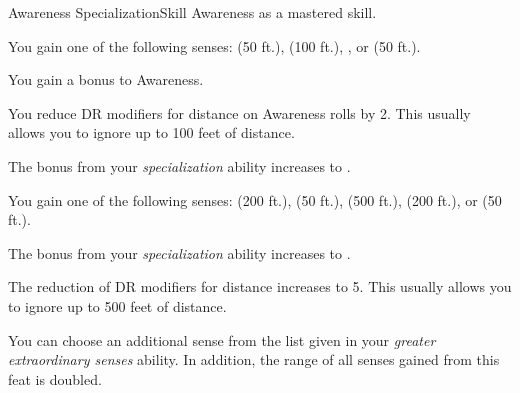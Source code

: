     \begin{feat}{Awareness Specialization}{Skill}
        \featpre Awareness as a mastered skill.

         You gain one of the following senses:  (50 ft.),  (100 ft.), , or  (50 ft.).

         You gain a  bonus to Awareness.

         You reduce DR modifiers for distance on Awareness rolls by 2.
        This usually allows you to ignore up to 100 feet of distance.

         The bonus from your \textit{specialization} ability increases to .

         You gain one of the following senses:  (200 ft.),  (50 ft.),  (500 ft.),  (200 ft.), or  (50 ft.).

         The bonus from your \textit{specialization} ability increases to .

         The reduction of DR modifiers for distance increases to 5.
        This usually allows you to ignore up to 500 feet of distance.

         You can choose an additional sense from the list given in your \textit{greater extraordinary senses} ability.
        In addition, the range of all senses gained from this feat is doubled.
    \end{feat}


